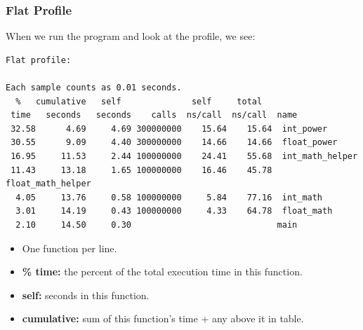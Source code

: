 \documentclass[aspectratio=43]{beamer}
\newenvironment{changemargin}[1]{%
  \begin{list}{}{%
    \setlength{\topsep}{0pt}%
    \setlength{\leftmargin}{#1}%
    \setlength{\rightmargin}{1em}
    \setlength{\listparindent}{\parindent}%
    \setlength{\itemindent}{\parindent}%
    \setlength{\parsep}{\parskip}%
  }%
  \item[]}{\end{list}}
\begin{document}
\begin{frame}[fragile]
  \frametitle{Flat Profile}

\begin{changemargin}{1cm}
    When we run the program and look at the profile, we see:

{
  \begin{lstlisting}[basicstyle=\tiny]
Flat profile:

Each sample counts as 0.01 seconds.
  %   cumulative   self              self     total           
 time   seconds   seconds    calls  ns/call  ns/call  name    
 32.58      4.69     4.69 300000000    15.64    15.64  int_power
 30.55      9.09     4.40 300000000    14.66    14.66  float_power
 16.95     11.53     2.44 100000000    24.41    55.68  int_math_helper
 11.43     13.18     1.65 100000000    16.46    45.78  float_math_helper
  4.05     13.76     0.58 100000000     5.84    77.16  int_math
  3.01     14.19     0.43 100000000     4.33    64.78  float_math
  2.10     14.50     0.30                             main
  \end{lstlisting}
}

  \begin{itemize}
    \item One function per line.
    \item {\bf \% time:} the percent of the total execution time in this function.
    \item {\bf self:} seconds in this function.
    \item {\bf cumulative:} sum of this function's time + any above it in table.
  \end{itemize}
\end{changemargin}
\end{frame}
\end{document}
